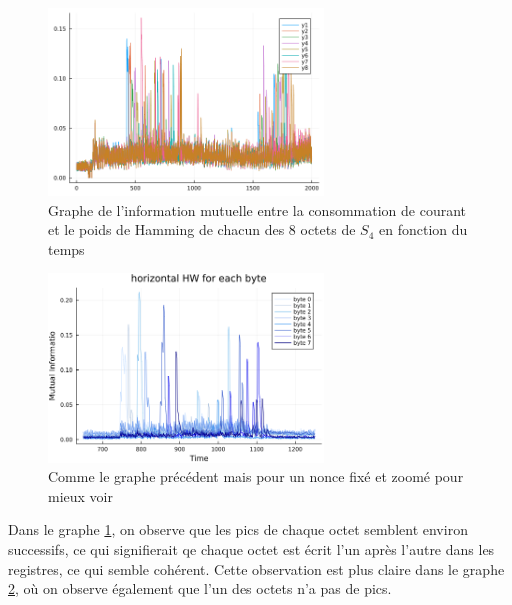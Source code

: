 \documentclass[12pt]{article}
\begin{document}
	\begin{figure}[H]
		\centering
		\includegraphics[width=0.65\textwidth]{img_files/hHW_each_byte}
		\caption{Graphe de l'information mutuelle entre la consommation de courant et le poids de Hamming de chacun des 8 octets de $S_4$ en fonction du temps}
		\label{hHW8}
	\end{figure}
	
	\begin{figure}[H]
		\centering
		\includegraphics[width = 0.65\textwidth]{img_files/hHW_8_bytes_zoom}
		\caption{Comme le graphe précédent mais pour un nonce fixé et zoomé pour mieux voir}
		\label{hHW8_zoom}
	\end{figure}
	
	Dans le graphe \ref{hHW8}, on observe que les pics de chaque octet semblent environ successifs, ce qui signifierait qe chaque octet est écrit l'un après l'autre dans les registres, ce qui semble cohérent. Cette observation est plus claire dans le graphe \ref{hHW8_zoom}, où on observe également que l'un des octets n'a pas de pics.
	
\end{document}
